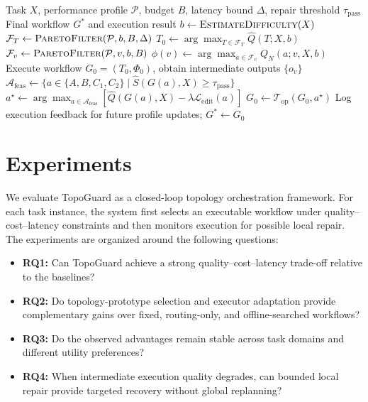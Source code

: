 \documentclass[manuscript,review,anonymous]{acmart}
\begin{document}
\begin{algorithm}[t]
\caption{TopoGuard Hierarchical Pareto Orchestration}
\label{alg:hpo}
\begin{algorithmic}[1]
\Require Task $X$, performance profile $\mathcal{P}$, budget $B$, latency bound $\Delta$, repair threshold $\tau_{\mathrm{pass}}$
\Ensure Final workflow $G^*$ and execution result
\State $b \gets \textsc{EstimateDifficulty}(X)$ 
\State $\mathcal{F}_T \gets \textsc{ParetoFilter}(\mathcal{P}, b, B, \Delta)$ 
\State $T_0 \gets \arg\max_{T \in \mathcal{F}_T} \hat{Q}(T; X, b)$ 
    \State $\mathcal{F}_v \gets \textsc{ParetoFilter}(\mathcal{P}, v, b, B)$ 
    \State $\phi(v) \gets \arg\max_{a \in \mathcal{F}_v} Q_N(a; v, X, b)$ 
\EndFor
\State Execute workflow $G_0 = (T_0, \Phi_0)$, obtain intermediate outputs $\{o_v\}$
     
        \State $\mathcal{A}_{\mathrm{feas}} \leftarrow
\{a \in \{A,B,C_1,C_2\} \mid \widehat{S}(G(a),X) \ge \tau_{\mathrm{pass}}\}$
        \State $a^\star \leftarrow
\arg\max_{a\in\mathcal{A}_{\mathrm{feas}}}
\left[\widehat{Q}(G(a),X)-\lambda\mathcal{L}_{\mathrm{edit}}(a)\right]$
        \State $G_0 \leftarrow \mathcal{T}_{\mathrm{op}}(G_0,a^\star)$ 
    \EndIf
\EndFor
\State Log execution feedback for future profile updates; \Return $G^* \gets G_0$
\end{algorithmic}
\end{algorithm}


\section{Experiments}
\label{sec:experiments}

We evaluate TopoGuard as a closed-loop topology orchestration framework. 
For each task instance, the system first selects an executable workflow under quality--cost--latency constraints and then monitors execution for possible local repair. 
The experiments are organized around the following questions:

\begin{itemize}
    \item \textbf{RQ1:} Can TopoGuard achieve a strong quality--cost--latency trade-off relative to the baselines?
    \item \textbf{RQ2:} Do topology-prototype selection and executor adaptation provide complementary gains over fixed, routing-only, and offline-searched workflows?
    \item \textbf{RQ3:} Do the observed advantages remain stable across task domains and different utility preferences?
    \item \textbf{RQ4:} When intermediate execution quality degrades, can bounded local repair provide targeted recovery without global replanning?
\end{itemize}
\end{document}
